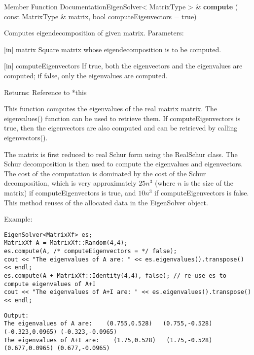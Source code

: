 %

\vspace{0.3cm}
Member Function DocumentationEigenSolver< MatrixType > \& \textbf{compute}  ( const MatrixType \&  matrix, bool  computeEigenvectors = true)   

Computes eigendecomposition of given matrix. 
Parameters: 

[in] matrix Square matrix whose eigendecomposition is to be computed.  

[in] computeEigenvectors If true, both the eigenvectors and the eigenvalues are computed; if false, only the eigenvalues are computed.  

Returns: Reference to *this 

This function computes the eigenvalues of the real matrix matrix. The eigenvalues() function can be used to retrieve them. If computeEigenvectors is true, then the eigenvectors are also computed and can be retrieved by calling eigenvectors().

The matrix is first reduced to real Schur form using the RealSchur class. The Schur decomposition is then used to compute the eigenvalues and eigenvectors.
The cost of the computation is dominated by the cost of the Schur decomposition, which is very approximately $25n^3$ (where $n$  is the size of the matrix) if computeEigenvectors is true, and $10n^3$ if computeEigenvectors is false.
This method reuses of the allocated data in the EigenSolver object.


Example:
\begin{lstlisting}
EigenSolver<MatrixXf> es;
MatrixXf A = MatrixXf::Random(4,4);
es.compute(A, /* computeEigenvectors = */ false);
cout << "The eigenvalues of A are: " << es.eigenvalues().transpose() << endl;
es.compute(A + MatrixXf::Identity(4,4), false); // re-use es to compute eigenvalues of A+I
cout << "The eigenvalues of A+I are: " << es.eigenvalues().transpose() << endl;
\end{lstlisting}

\begin{verbatim}
Output:
The eigenvalues of A are:    (0.755,0.528)   (0.755,-0.528)  (-0.323,0.0965) (-0.323,-0.0965)
The eigenvalues of A+I are:    (1.75,0.528)   (1.75,-0.528)  (0.677,0.0965) (0.677,-0.0965)
\end{verbatim}



